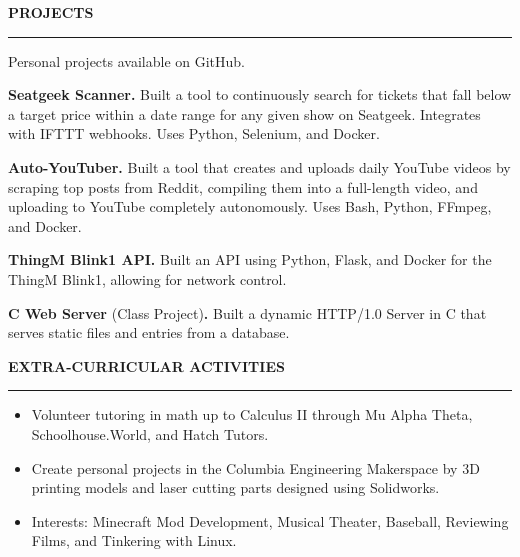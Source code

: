 \documentclass[10pt,letterpaper]{article}
\begin{document}

\medskip
\MakeUppercase{{\bf Projects}}
\medskip
\hrule
\begin{list}{}{\setlength{\leftmargin}{0em}}
    \item
          \vspace{-1.25em}
    \item {Personal projects available on GitHub. }
    \item \textbf{Seatgeek Scanner.} {Built a tool to continuously search for tickets that fall below a target price within a date range for any given show on Seatgeek. Integrates with IFTTT webhooks. Uses Python, Selenium, and Docker. }
    \item \textbf{Auto-YouTuber.} {Built a tool that creates and uploads daily YouTube videos by scraping top posts from Reddit, compiling them into a full-length video, and uploading to YouTube completely autonomously. Uses Bash, Python, FFmpeg, and Docker. }
    \item \textbf{ThingM Blink1 API.} {Built an API using Python, Flask, and Docker for the ThingM Blink1, allowing for network control.}
    \item \textbf{C Web Server} {(Class Project)\textbf{.} Built a dynamic HTTP/1.0 Server in C that serves static files and entries from a database.}
\end{list}


\medskip
\MakeUppercase{{\bf Extra-Curricular Activities}}
\medskip
\hrule
\begin{list}{}{\setlength{\leftmargin}{0em}}
    \item
          \begin{itemize}
              \item Volunteer tutoring in math up to Calculus II through Mu Alpha Theta, Schoolhouse.World, and Hatch Tutors.
              \item Create personal projects in the Columbia Engineering Makerspace by 3D printing models and laser cutting parts designed using Solidworks.
              \item Interests: Minecraft Mod Development, Musical Theater, Baseball, Reviewing Films, and Tinkering with Linux.
          \end{itemize}
\end{list}
\end{document}
